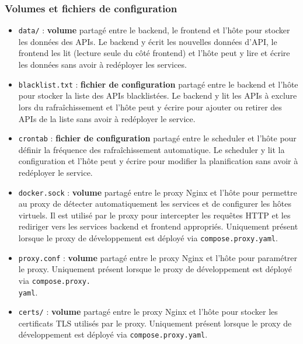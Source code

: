 \subsubsection{Volumes et fichiers de configuration}
\begin{itemize}
    \item[$\bullet$] \texttt{data/} : \textbf{volume} partagé entre le backend, le frontend et l'hôte pour stocker les données des APIs. Le backend y écrit les nouvelles données d'API, le frontend les lit (lecture seule du côté frontend) et l'hôte peut y lire et écrire les données sans avoir à redéployer les services.
    \item[$\bullet$] \texttt{blacklist.txt} : \textbf{fichier de configuration} partagé entre le backend et l'hôte pour stocker la liste des APIs blacklistées. Le backend y lit les APIs à exclure lors du rafraîchissement et l'hôte peut y écrire pour ajouter ou retirer des APIs de la liste sans avoir à redéployer le service.
    \item[$\bullet$] \texttt{crontab} : \textbf{fichier de configuration} partagé entre le scheduler et l'hôte pour définir la fréquence des rafraîchissement automatique. Le scheduler y lit la configuration et l'hôte peut y écrire pour modifier la planification sans avoir à redéployer le service.
    \item[$\bullet$] \texttt{docker.sock} : \textbf{volume} partagé entre le proxy Nginx et l'hôte pour permettre au proxy de détecter automatiquement les services et de configurer les hôtes virtuels. Il est utilisé par le proxy pour intercepter les requêtes HTTP et les rediriger vers les services backend et frontend appropriés. Uniquement présent lorsque le proxy de développement est déployé via \texttt{compose.proxy.yaml}.
    \item[$\bullet$] \texttt{proxy.conf} : \textbf{volume} partagé entre le proxy Nginx et l'hôte pour paramétrer le proxy. Uniquement présent lorsque le proxy de développement est déployé via \texttt{compose.proxy.\\yaml}.
    \item[$\bullet$] \texttt{certs/} : \textbf{volume} partagé entre le proxy Nginx et l'hôte pour stocker les certificats TLS utilisés par le proxy. Uniquement présent lorsque le proxy de développement est déployé via \texttt{compose.proxy.yaml}.
\end{itemize}

